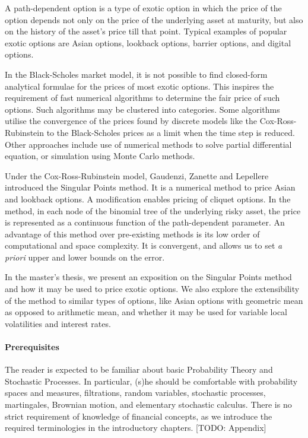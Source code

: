 
A path-dependent option is a type of exotic option in which the price of the option depends not only on the price of the underlying asset at maturity, but also on the history of the asset's price till that point. Typical examples of popular exotic options are Asian options, lookback options, barrier options, and digital options.

In the Black-Scholes market model, it is not possible to find closed-form analytical formulae for the prices of most exotic options. This inspires the requirement of fast numerical algorithms to determine the fair price of such options. Such algorithms may be clustered into categories. Some algorithms utilise the convergence of the prices found by discrete models like the Cox-Ross-Rubinstein to the Black-Scholes prices as a limit when the time step is reduced. Other approaches include use of numerical methods to solve partial differential equation, or simulation using Monte Carlo methods.

Under the Cox-Ross-Rubinstein model, Gaudenzi, Zanette and Lepellere introduced the Singular Points method. It is a numerical method to price Asian and lookback options. A modification enables pricing of cliquet options. In the method, in each node of the binomial tree of the underlying risky asset, the price is represented as a continuous function of the path-dependent parameter. An advantage of this method over pre-existing methods is its low order of computational and space complexity. It is convergent, and allows us to set \emph{a priori} upper and lower bounds on the error.

In the master's thesis, we present an exposition on the Singular Points method and how it may be used to price exotic options. We also explore the extensibility of the method to similar types of options, like Asian options with geometric mean as opposed to arithmetic mean, and whether it may be used for variable local volatilities and interest rates.


\paragraph{Prerequisites}
The reader is expected to be familiar about basic Probability Theory and Stochastic Processes. In particular, (s)he should be comfortable with probability spaces and measures, filtrations, random variables, stochastic processes, martingales, Brownian motion, and elementary stochastic calculus. There is no strict requirement of knowledge of financial concepts, as we introduce the required terminologies in the introductory chapters. [TODO: Appendix]


